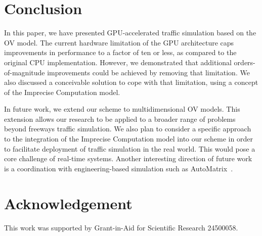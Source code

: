 \documentclass[times, 10pt, twocolumn]{article}
\begin{document}
\section{Conclusion}
\label{sec:conclusion}

In this paper, we have presented GPU-accelerated traffic simulation
based on the OV model.
The current hardware limitation of the GPU architecture caps
improvements in performance to a factor of ten or less, as compared to
the original CPU implementation.
However, we demonstrated that additional orders-of-magnitude
improvements could be achieved by removing that limitation.
We also discussed a conceivable solution to cope with that limitation,
using a concept of the Imprecise Computation model.

In future work, we extend our scheme to multidimensional OV models.
This extension allows our research to be applied to a broader range of
problems beyond freeways traffic simulation.
We also plan to consider a specific approach to the integration of the
Imprecise Computation model into our scheme in order to facilitate
deployment of traffic simulation in the real world.
This would pose a core challenge of real-time systems.
Another interesting direction of future work is a coordination with
engineering-based simulation such as AutoMatrix~\cite{Mangharam2011}.

\section*{Acknowledgement}

This work was supported by Grant-in-Aid for Scientific Research
24500058.


{\footnotesize

}
\end{document}
